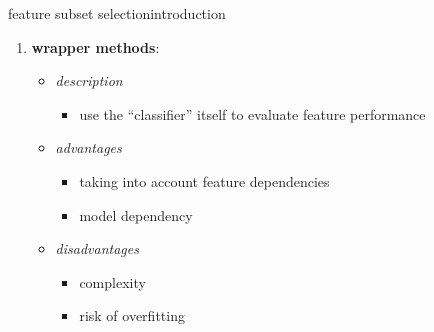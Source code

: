 		\begin{frame}{feature subset selection}{introduction}
            \vspace{-2mm}
			\begin{enumerate}
				\item	\textbf{wrapper methods}:
                    \begin{itemize}
                        \item \textit{description}
                            \begin{itemize}
                                \item  use the ``classifier'' itself to evaluate feature performance
                            \end{itemize}
                         \item \textit{advantages}
                            \begin{itemize}
                                \item   taking into account feature dependencies
                                \item   model dependency
                            \end{itemize}
                         \item \textit{disadvantages}
                            \begin{itemize}
                                \item   complexity
                                \item   risk of overfitting
                            \end{itemize}
                  \end{itemize}
				

\end{enumerate}
\end{frame}
